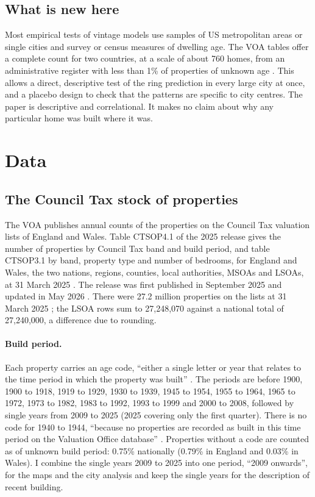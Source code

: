 \documentclass[11pt,a4paper]{article}
\begin{document}
\subsection{What is new here}
Most empirical tests of vintage models use samples of US metropolitan areas or single cities and survey or census measures of dwelling age. The VOA tables offer a complete count for two countries, at a scale of about 760 homes, from an administrative register with less than 1\% of properties of unknown age \citep{voa2025bg}. This allows a direct, descriptive test of the ring prediction in every large city at once, and a placebo design to check that the patterns are specific to city centres. The paper is descriptive and correlational. It makes no claim about why any particular home was built where it was.

\section{Data}
\label{sec:data}
\subsection{The Council Tax stock of properties}
The VOA publishes annual counts of the properties on the Council Tax valuation lists of England and Wales. Table CTSOP4.1 of the 2025 release gives the number of properties by Council Tax band and build period, and table CTSOP3.1 by band, property type and number of bedrooms, for England and Wales, the two nations, regions, counties, local authorities, MSOAs and LSOAs, at 31 March 2025 \citep{voa2025}. The release was first published in September 2025 and updated in May 2026 \citep{voa2025com}. There were 27.2 million properties on the lists at 31 March 2025 \citep{voa2025com}; the LSOA rows sum to 27,248,070 against a national total of 27,240,000, a difference due to rounding.

\paragraph{Build period.} Each property carries an age code, ``either a single letter or year that relates to the time period in which the property was built'' \citep{voa2025bg}. The periods are before 1900, 1900 to 1918, 1919 to 1929, 1930 to 1939, 1945 to 1954, 1955 to 1964, 1965 to 1972, 1973 to 1982, 1983 to 1992, 1993 to 1999 and 2000 to 2008, followed by single years from 2009 to 2025 (2025 covering only the first quarter). There is no code for 1940 to 1944, ``because no properties are recorded as built in this time period on the Valuation Office database'' \citep{voa2025bg}. Properties without a code are counted as of unknown build period: 0.75\% nationally (0.79\% in England and 0.03\% in Wales). I combine the single years 2009 to 2025 into one period, ``2009 onwards'', for the maps and the city analysis and keep the single years for the description of recent building.
\end{document}
